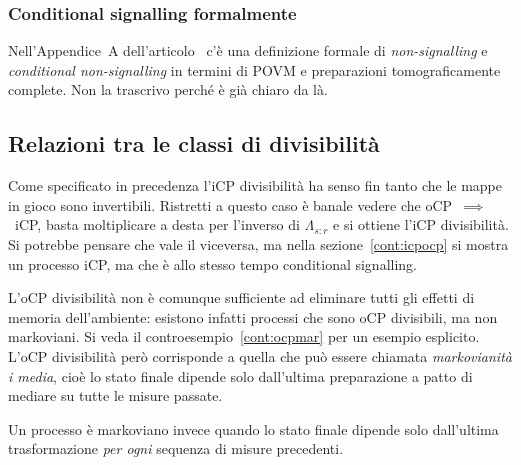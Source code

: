 \documentclass[a4]{article}
\begin{document}
\subsubsection{Conditional signalling formalmente}
Nell'Appendice~A dell'articolo~\cite{CPdoesnotimply} c'è una definizione formale di
\emph{non-signalling} e \emph{conditional non-signalling} in termini di POVM e preparazioni
tomograficamente complete. Non la trascrivo perché è già chiaro da là.

\subsection{Relazioni tra le classi di divisibilità}
Come specificato in precedenza l'iCP divisibilità ha senso fin tanto che le mappe in gioco
sono invertibili. Ristretti a questo caso è banale vedere che oCP~\(\implies\)~iCP, basta 
moltiplicare a desta per l'inverso di \(\Lambda_{s\colon r}\) e si ottiene l'iCP divisibilità.
Si potrebbe pensare che vale il viceversa, ma nella sezione~\ref{cont:icpocp} si mostra
un processo iCP, ma che è allo stesso tempo conditional signalling.

L'oCP divisibilità non è comunque sufficiente ad eliminare tutti gli effetti di memoria
dell'ambiente: esistono infatti processi che sono oCP divisibili, ma non markoviani.
Si veda il controesempio~\ref{cont:ocpmar} per un esempio esplicito.
L'oCP divisibilità però corrisponde a quella che può essere chiamata \emph{markovianità
i media}, cioè lo stato finale dipende solo dall'ultima preparazione a patto di mediare
su tutte le misure passate.


Un processo è markoviano invece quando lo stato finale dipende solo dall'ultima trasformazione
\emph{per ogni} sequenza di misure precedenti.
\end{document}
